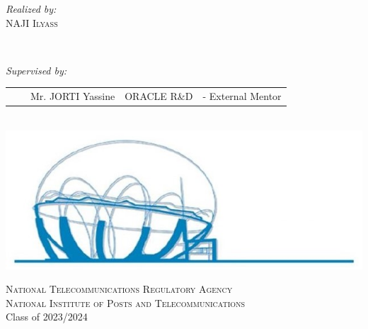 \begin{titlepage}
\begin{center}
  \noindent
  \begin{minipage}{0.9\textwidth}
    \vspace{-7mm}
    \begin{flushleft} \large
      \emph{Realized by:}\\
      \hspace{0.95cm} NAJI \textsc{Ilyass}  \\
    \end{flushleft}
  \end{minipage}
  \begin{minipage}{0.4\textwidth}
  \end{minipage}\\[1.3cm]

  \begin{minipage}{0.9\textwidth}
    \vspace{-7mm}
    \begin{flushleft} \large
      \emph{Supervised by:}\\
      \begin{tabular}{ll  l l l}
      &&Mr. JORTI Yassine & ORACLE R\&D  & - External Mentor \\
      \end{tabular}
    \end{flushleft}
  \end{minipage}\\[0.6cm]


  \vspace{0.8cm}
  \includegraphics[scale=0.8]{Images/inpt_fig.jpg}
  
  \vspace{0.2cm}
  \textsc{National Telecommunications Regulatory Agency}\\
  \textsc{National Institute of Posts and Telecommunications}\\
  \vspace{0.5cm}
  {\large Class of 2023/2024}
  
  \end{center}
  \end{titlepage}
  